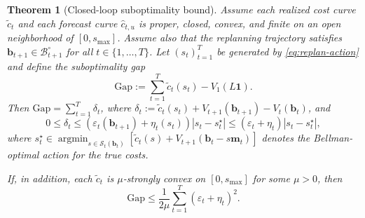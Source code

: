 \documentclass{uai2026} %
\newtheorem{theorem}{Theorem}[section]
\newcommand{\1}{\mathbf{1}}
\newcommand{\scalt}{\mathcal{S}_{t}}
\renewcommand{\epsilon}{\varepsilon}
\newcommand{\bcal}{\mathcal{B}}
\newcommand{\argmin}{\operatorname*{argmin}}
\begin{document}
\begin{theorem}[Closed-loop suboptimality bound]
  \label{thm:replan-regret}
  Assume each realized cost curve $\tilde{c}_t$ and each forecast curve $\hat{c}_{t,u}$ is proper, closed, convex, and finite on an open neighborhood of $[0,s_{\max}]$.
  Assume also that the replanning trajectory satisfies $\mathbf{b}_{t+1}\in\bcal_{t+1}^{\circ}$ for all $t\in\{1,\dots,T\}$.
  Let $(s_t)_{t=1}^{T}$ be generated by \eqref{eq:replan-action} and define the suboptimality gap
  \begin{equation*}
    \mathrm{Gap} := \sum_{t=1}^{T} \tilde{c}_t(s_t) - V_1(L\1).
  \end{equation*}
  Then $\mathrm{Gap}=\sum_{t=1}^{T} \delta_t$, where $\delta_t:=\tilde{c}_t(s_t)+V_{t+1}(\mathbf{b}_{t+1})-V_t(\mathbf{b}_t)$, and
  \begin{equation*}
    0 \le \delta_t \le \left(\epsilon_t(\mathbf{b}_{t+1})+\eta_t(s_t)\right)|s_t-s_t^{\star}|
    \le (\epsilon_t+\eta_t)|s_t-s_t^{\star}|,
  \end{equation*}
  where $s_t^{\star}\in\argmin_{s\in\scalt(\mathbf{b}_t)}[\tilde{c}_t(s)+V_{t+1}(\mathbf{b}_t-s\mathbf{m}_t)]$ denotes the Bellman-optimal action for the true costs.

  If, in addition, each $\tilde{c}_t$ is $\mu$-strongly convex on $[0,s_{\max}]$ for some $\mu>0$, then
  \begin{equation*}
    \mathrm{Gap} \le \frac{1}{2\mu}\sum_{t=1}^{T} (\epsilon_t+\eta_t)^2.
  \end{equation*}
\end{theorem}
\end{document}
